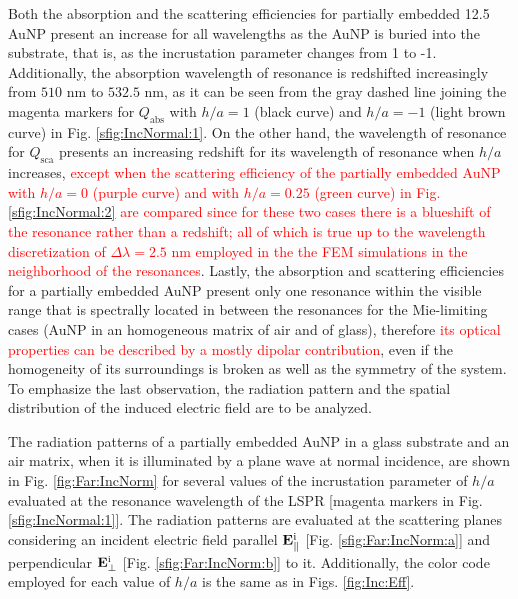 Both the absorption and the scattering efficiencies for partially embedded 12.5 AuNP present an increase  for all wavelengths as the AuNP is buried into the substrate, that is, as the incrustation parameter changes from 1 to -1. Additionally, the  absorption wavelength of resonance is redshifted  increasingly from $510$ nm to $532.5$ nm, as it can be seen from the gray dashed line joining the magenta markers for  $Q_\text{abs}$  with $h/a = 1$ (black curve) and $h/a = -1$ (light brown curve) in Fig. \ref{sfig:IncNormal:1}. On the other hand, the wavelength of resonance for $Q_\text{sca}$ presents an increasing redshift for its wavelength of resonance when $h/a$ increases, \textcolor{red}{except when the scattering efficiency of the partially embedded AuNP with $h/a = 0$ (purple curve) and with $h/a = 0.25$ (green curve) in Fig. \ref{sfig:IncNormal:2} are compared since for these two cases there is a blueshift of the resonance rather than a redshift; all of which is true up to the wavelength discretization of $\Delta\lambda = 2.5$ nm employed in the the FEM simulations in the neighborhood of the resonances}. Lastly, the absorption and scattering efficiencies for a partially embedded AuNP present only one resonance within the visible range that is spectrally located in between the resonances for the Mie-limiting cases (AuNP in an homogeneous matrix of air and of glass), therefore \textcolor{red}{its optical properties can be described by a mostly dipolar contribution}, even if the homogeneity of its surroundings is broken as well as the symmetry of the system. To emphasize the last observation, the radiation pattern and the spatial distribution of the induced electric field are to be analyzed.

The radiation patterns of a partially embedded AuNP in a glass substrate and an air matrix, when it is illuminated by a plane wave  at normal incidence, are shown in Fig. \ref{fig:Far:IncNorm} for several values of the incrustation parameter of $h/a$ evaluated at the resonance wavelength of the LSPR [magenta markers in Fig. \ref{sfig:IncNormal:1}]. The  radiation patterns are evaluated at the scattering planes considering an incident electric field parallel  $\vb{E}^\text{i}_\parallel$ [Fig. \ref{sfig:Far:IncNorm:a}] and  perpendicular  $\vb{E}^\text{i}_\perp$ [Fig. \ref{sfig:Far:IncNorm:b}] to it. Additionally, the color code employed for each value of $h/a$ is the same as in Figs. \ref{fig:Inc:Eff}.

